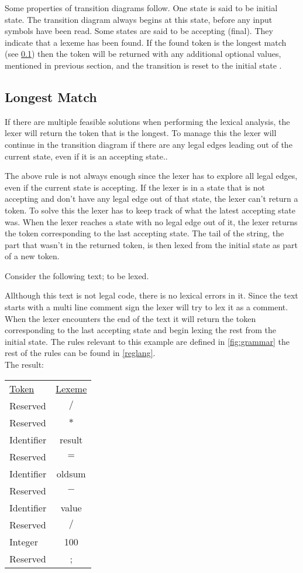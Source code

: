 Some properties of transition diagrams
follow. One state is said to be initial state. The transition 
diagram always begins at this state, before any input symbols have been read. 
Some states are said to be accepting (final). They indicate that a lexeme has 
been found. If the found token is the longest match (see \cref{longmatch}) then the token will be 
returned with any additional optional values, mentioned in previous section, 
and the transition is reset to the initial state \cite{Aho2006}.

\subsection{Longest Match}\label{longmatch}
If there are multiple feasible solutions when performing the lexical
analysis, the lexer will return the token that is the longest. To manage this
the lexer will continue in the transition diagram if there are any legal edges
leading out of the current state, even if it is an accepting state.\cite{Aho2006}.

The above rule is not always enough since the lexer has to explore all legal
edges, even if the current state is accepting. If the lexer is in a state that
is not accepting and don't have any legal edge out of that state, the lexer
can't return a token. To solve this the lexer has to keep track of what the
latest accepting state was. When the lexer reaches a state with no
legal edge out of it, the lexer returns the token corresponding to the last
accepting state. The tail of the string, the part that wasn't in the returned
token, is then lexed from the initial state as part of a new token.\cite{Aho2006}

\begin{example} \label{longestMatch}
Consider the following text; to be lexed.

Allthough this text is not legal code, there is no lexical errors in it. Since
the text starts with a multi line comment sign the lexer will try to lex it as
a comment. When the lexer encounters the end of the text it will return the
token corresponding to the last accepting state and begin lexing the rest from
the initial state. The rules relevant to this example are defined in 
\cref{fig:grammar} the rest of the rules can be found in \cref{reglang}.\\
The result:
\begin{center}
\begin{tabular}{l c}
\underline{Token} & \underline{Lexeme}\\
Reserved & $/$\\
Reserved & $*$\\
Identifier & result\\
Reserved & $=$\\
Identifier & oldsum\\
Reserved & $-$\\
Identifier & value\\
Reserved & $/$\\
Integer & 100\\
Reserved & ;
\end{tabular}
\end{center}
\end{example}

